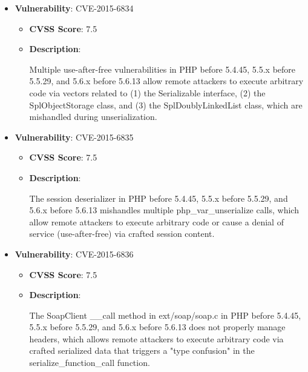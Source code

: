 \documentclass{article}
\begin{document}
\begin{itemize}
        \item \textbf{Vulnerability}: CVE-2015-6834
        \begin{itemize}
            \item \textbf{CVSS Score}:  7.5 
            \item \textbf{Description}:
            \parbox[t]{0.9\linewidth}{
                \ttfamily Multiple use-after-free vulnerabilities in PHP before 5.4.45, 5.5.x before 5.5.29, and 5.6.x before 5.6.13 allow remote attackers to execute arbitrary code via vectors related to (1) the Serializable interface, (2) the SplObjectStorage class, and (3) the SplDoublyLinkedList class, which are mishandled during unserialization.
            }
        \end{itemize}
    
        \item \textbf{Vulnerability}: CVE-2015-6835
        \begin{itemize}
            \item \textbf{CVSS Score}:  7.5 
            \item \textbf{Description}:
            \parbox[t]{0.9\linewidth}{
                \ttfamily The session deserializer in PHP before 5.4.45, 5.5.x before 5.5.29, and 5.6.x before 5.6.13 mishandles multiple php\_var\_unserialize calls, which allow remote attackers to execute arbitrary code or cause a denial of service (use-after-free) via crafted session content.
            }
        \end{itemize}
    
        \item \textbf{Vulnerability}: CVE-2015-6836
        \begin{itemize}
            \item \textbf{CVSS Score}:  7.5 
            \item \textbf{Description}:
            \parbox[t]{0.9\linewidth}{
                \ttfamily The SoapClient \_\_call method in ext/soap/soap.c in PHP before 5.4.45, 5.5.x before 5.5.29, and 5.6.x before 5.6.13 does not properly manage headers, which allows remote attackers to execute arbitrary code via crafted serialized data that triggers a "type confusion" in the serialize\_function\_call function.
            }
        \end{itemize}
    

\end{itemize}
\end{document}
